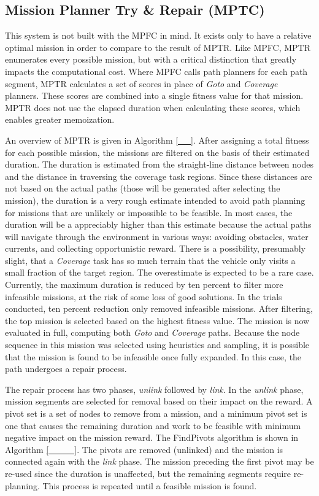 \documentclass{tamuccthesis}
\begin{document}
\subsection{Mission Planner Try \& Repair (MPTC)}

This system is not built with the MPFC in mind. It exists only to have a relative optimal mission in order to compare to the result of MPTR. Like MPFC, MPTR enumerates every possible mission, but with a critical distinction that greatly impacts the computational cost. Where MPFC calls path planners for each path segment, MPTR calculates a set of scores in place of \textit{Goto} and \textit{Coverage} planners. These scores are combined into a single fitness value for that mission. MPTR does not use the elapsed duration when calculating these scores, which enables greater memoization. 

An overview of MPTR is given in Algorithm \ref{__}. After assigning a total fitness for each possible mission, the missions are filtered on the basis of their estimated duration. The duration is estimated from the straight-line distance between nodes and the distance in traversing the coverage task regions. Since these distances are not based on the actual paths (those will be generated after selecting the mission), the duration is a very rough estimate intended to avoid path planning for missions that are unlikely or impossible to be feasible. In most cases, the duration will be a appreciably higher than this estimate because the actual paths will navigate through the environment in various ways: avoiding obstacles, water currents, and collecting opportunistic reward. There is a possibility, presumably slight, that a \textit{Coverage} task has so much terrain that the vehicle only visits a small fraction of the target region. The overestimate is expected to be a rare case. Currently, the maximum duration is reduced by ten percent to filter more infeasible missions, at the risk of some loss of good solutions. In the trials conducted, ten percent reduction only removed infeasible missions. After filtering, the top mission is selected based on the highest fitness value. The mission is now evaluated in full, computing both \textit{Goto} and \textit{Coverage} paths. Because the node sequence in this mission was selected using heuristics and sampling, it is possible that the mission is found to be infeasible once fully expanded. In this case, the path undergoes a repair process. 

The repair process has two phases, \textit{unlink} followed by \textit{link}. In the \textit{unlink} phase, mission segments are selected for removal based on their impact on the reward. A pivot set is a set of nodes to remove from a mission, and a minimum pivot set is one that causes the remaining duration and work to be feasible with minimum negative impact on the mission reward. The FindPivots algorithm is shown in Algorithm \ref{____}. The pivots are removed (unlinked) and the mission is connected again with the \textit{link} phase. The mission preceding the first pivot may be re-used since the duration is unaffected, but the remaining segments require re-planning. This process is repeated until a feasible mission is found. 
\end{document}
